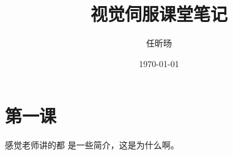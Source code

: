 \documentclass[UTF8]{ctexart}
\title{视觉伺服课堂笔记}
\author{任昕旸}
\date{\today}
\begin{document}
\maketitle
\section{第一课}
感觉老师讲的都 是一些简介，这是为什么啊。
\nocite{*}
\cite{chaumette2006visual}



\end{document}
